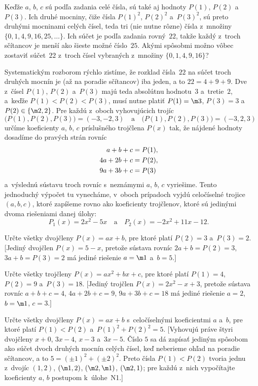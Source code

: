 {%
Keďže $a$, $b$, $c$ sú podľa zadania celé čísla,
sú také aj hodnoty $P(1)$, $P(2)$ a~$P(3)$. Ich druhé
mocniny, čiže čísla
$P(1)^2$, $P(2)^2$ a~$P(3)^2$,
sú preto druhými mocninami celých čísel, teda tri (nie nutne rôzne)
čísla z~množiny $\{0, 1, 4, 9, 16, 25, \dots\}$. Ich súčet je podľa
zadania rovný~$22$, takže každý z~troch sčítancov je menší ako šieste
možné číslo~$25$. Akými spôsobmi možno vôbec zostaviť
súčet~$22$ z~troch čísel vybraných z~množiny $\{0, 1, 4, 9, 16\}$?

Systematickým rozborom rýchlo zistíme, že rozklad čísla~$22$
na súčet troch druhých mocnín je (až na poradie sčítancov) iba jeden,
a to $22=4+9+9$.
Dve z~čísel $P(1)$, $P(2)$ a~$P(3)$ majú teda absolútnu hodnotu~$3$
a~tretie~$2$, a~keďže $P(1)<P(2)<P(3)$, musí nutne platiť $P(1)={\m3}$, $P(3)=3$
a~$P(2)\in\{{\m2}, 2\}$. Pre každú z~oboch vyhovujúcich trojíc
$$
\bigl(P(1),P(2),P(3)\bigr)=(-3,-2, 3)\quad\text{a}\quad
\bigl(P(1),P(2),P(3)\bigr)=(-3, 2, 3)
$$
určíme koeficienty $a$, $b$, $c$ príslušného trojčlena $P(x)$ tak,
že nájdené hodnoty dosadíme do pravých strán rovníc
$$
\aligned
a+b+c&=P(1),\\
4a+2b+c&=P(2),\\
9a+3b+c&=P(3)
\endaligned
$$
a~výslednú sústavu troch rovníc s~neznámymi $a$, $b$, $c$ vyriešime.
Tento jednoduchý výpočet tu vynecháme, v~oboch
prípadoch vyjdú celočíselné trojice $(a,b,c)$, ktoré zapíšeme rovno
ako koeficienty trojčlenov, ktoré sú jedinými dvoma riešeniami
danej úlohy:
$$
P_1(x)=2x^2-5x\quad\text{a}\quad
P_2(x)=-2x^2+11x-12.
$$



Určte všetky dvojčleny $P(x)=ax+b$, pre ktoré platí
$P(2)=3$ a~$P(3)=2$. [Jediný dvojčlen $P(x)=5-x$, pretože sústava
rovníc $2a+b=P(2)=3$, $3a+b=P(3)=2$ má jediné riešenie $a={\m1}$
a~$b=5$.]

Určte všetky trojčleny $P(x)=ax^2+bx+c$, pre ktoré platí
$P(1)=4$, $P(2)=9$ a~$P(3)=18$. [Jediný trojčlen $P(x)=2x^2-x+3$,
pretože sústava rovníc $a+b+c=4$, $4a+2b+c=9$, $9a+3b+c=18$
má jediné riešenie $a=2$, $b={\m1}$, $c=3$.]

Určte všetky dvojčleny $P(x)=ax+b$ s~celočíselnými
koeficientmi $a$ a~$b$, pre ktoré platí $P(1)<P(2)$
a~$P(1)^2+P(2)^2=5$. [Vyhovujú práve štyri
dvojčleny $x+0$, $3x-4$, $x-3$ a~$3x-5$. Číslo $5$ sa dá zapísať jediným
spôsobom ako súčet dvoch druhých mocnín celých čísel,
keď neberieme ohľad na poradie sčítancov, a to $5=(\pm1)^2+(\pm2)^2$.
Preto čísla $P(1)<P(2)$ tvoria jednu z~dvojíc $(1,2)$, $({\m1},2)$,
$(\m2,\m1)$, $(\m2,1)$; pre každú z~nich vypočítajte koeficienty
$a$, $b$ postupom k~úlohe~N1.]

}
